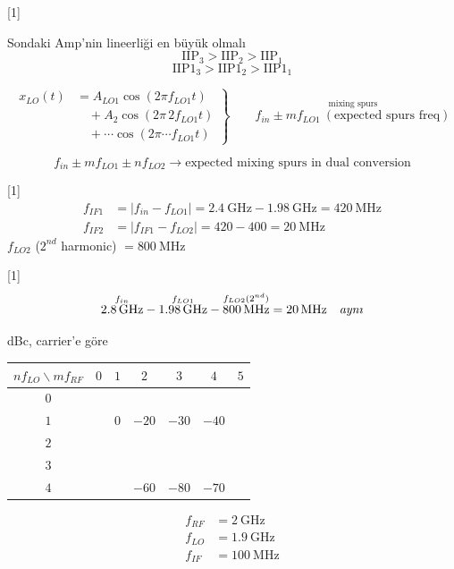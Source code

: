 \documentclass[11pt,a4paper]{article}
\begin{document}

[1]

Sondaki Amp'nin lineerliği en büyük olmalı
\[ \mathrm{IIP}_3 > \mathrm{IIP}_2 > \mathrm{IIP}_1 \]
\[ \mathrm{IIP1}_3 > \mathrm{IIP1}_2 > \mathrm{IIP1}_1 \]

\[
\left.\begin{aligned}
x_{LO}(t) &= A_{LO1}\cos(2\pi f_{LO1}t)\\
&\quad + A_2\cos(2\pi\, 2f_{LO1}t)\\
&\quad + \cdots\cos(2\pi\cdots f_{LO1}t)
\end{aligned}\right\}
\qquad \overset{\text{mixing spurs}}{f_{in} \pm m f_{LO1}\ (\text{expected spurs freq})}
\]

\[ f_{in} \pm m f_{LO1} \pm n f_{LO2} \rightarrow \text{expected mixing spurs in dual conversion} \]

\begin{ornek}
[1]
\begin{align*}
f_{IF1} &= |f_{in} - f_{LO1}| = \qty{2,4}{\giga\hertz} - \qty{1,98}{\giga\hertz} = \qty{420}{\mega\hertz}\\
f_{IF2} &= |f_{IF1} - f_{LO2}| = 420 - 400 = \qty{20}{\mega\hertz}
\end{align*}
$f_{LO2}$ ($2^{nd}$ harmonic) $= \qty{800}{\mega\hertz}$

[1]
\[ \overset{f_{in}}{\qty{2,8}{\giga\hertz}} - \overset{f_{LO1}}{\qty{1,98}{\giga\hertz}} - \overset{f_{LO2}(2^{nd})}{\qty{800}{\mega\hertz}} = \qty{20}{\mega\hertz} \quad \text{\textit{aynı}} \]
\end{ornek}

\noindent dBc, carrier'e göre
\begin{center}
\renewcommand{\arraystretch}{1.5}
\begin{tabular}{c|cccccc}
$n f_{LO} \backslash m f_{RF}$ & $0$ & $1$ & $2$ & $3$ & $4$ & $5$ \\ \hline
$0$ & & & & & & \\ \hline
$1$ & & $0$ & $-20$ & $-30$ & $-40$ & \\ \hline
$2$ & & & & & & \\ \hline
$3$ & & & & & & \\ \hline
$4$ & & & $-60$ & $-80$ & $-70$ & \\
\end{tabular}
\end{center}
\begin{align*}
f_{RF} &= \qty{2}{\giga\hertz}\\
f_{LO} &= \qty{1,9}{\giga\hertz}\\
f_{IF} &= \qty{100}{\mega\hertz}
\end{align*}
\end{document}

